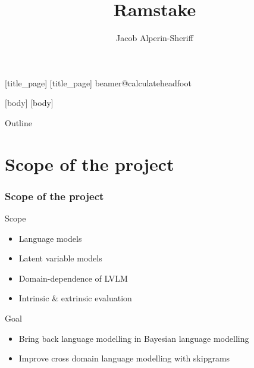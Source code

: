 \documentclass[11pt,t]{beamer}
\title{Ramstake}
\author{Jacob Alperin-Sheriff}
\institute{NIST}
\begin{document}
    [title_page]
    [title_page]
    \csname beamer@calculateheadfoot\endcsname %
        \begin{frame}
            \titlepage
        \end{frame}
    [body]
    [body]

\begin{frame}{Outline}
    \vskip 5mm
    {\parbox{.95\textwidth}{\tableofcontents[hideallsubsections]}}
\end{frame}

%
%
%
\section{Scope of the project}

\begin{frame}    
    \frametitle{Scope of the project}

    \begin{block}{Scope}
        \begin{itemize}
            \item Language models
            \item Latent variable models
            \item Domain-dependence of LVLM
            \item Intrinsic \& extrinsic evaluation
        \end{itemize}
    \end{block}

    \begin{block}{Goal}
        \begin{itemize}
            \item Bring back language modelling in Bayesian language modelling    
            \item Improve cross domain language modelling with skipgrams
        \end{itemize}
    \end{block}
\end{frame}
\end{document}
